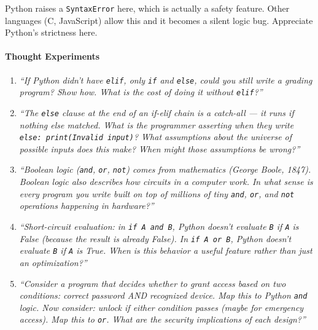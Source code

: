 \documentclass[
  justified,
  openright,
]{tufte-book}
\let\paragraph\paragraph
\let\paragraph\paragraph
\begin{document}
Python raises a \texttt{SyntaxError} here, which is actually a safety
feature. Other languages (C, JavaScript) allow this and it becomes a
silent logic bug. Appreciate Python's strictness here.

\paragraph{Thought Experiments}\label{thought-experiments-9}

\begin{enumerate}
\def\labelenumi{\arabic{enumi}.}
\item
  \emph{``If Python didn't have \texttt{elif}, only \texttt{if} and
  \texttt{else}, could you still write a grading program? Show how. What
  is the cost of doing it without \texttt{elif}?''}
\item
  \emph{``The \texttt{else} clause at the end of an if-elif chain is a
  catch-all --- it runs if nothing else matched. What is the programmer
  asserting when they write
  \texttt{else:\ print(\textquotesingle{}Invalid\ input\textquotesingle{})}?
  What assumptions about the universe of possible inputs does this make?
  When might those assumptions be wrong?''}
\item
  \emph{``Boolean logic (\texttt{and}, \texttt{or}, \texttt{not}) comes
  from mathematics (George Boole, 1847). Boolean logic also describes
  how circuits in a computer work. In what sense is every program you
  write built on top of millions of tiny \texttt{and}, \texttt{or}, and
  \texttt{not} operations happening in hardware?''}
\item
  \emph{``Short-circuit evaluation: in \texttt{if\ A\ and\ B}, Python
  doesn't evaluate \texttt{B} if \texttt{A} is False (because the result
  is already False). In \texttt{if\ A\ or\ B}, Python doesn't evaluate
  \texttt{B} if \texttt{A} is True. When is this behavior a useful
  feature rather than just an optimization?''}
\item
  \emph{``Consider a program that decides whether to grant access based
  on two conditions: correct password AND recognized device. Map this to
  Python \texttt{and} logic. Now consider: unlock if either condition
  passes (maybe for emergency access). Map this to \texttt{or}. What are
  the security implications of each design?''}
\end{enumerate}
\end{document}
